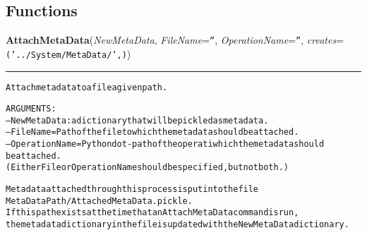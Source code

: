 
  \subsection{Functions}

    \label{System:MetaData:AttachMetaData}

    \vspace{0.5ex}

\hspace{.8\funcindent}\begin{boxedminipage}{\funcwidth}

    \raggedright \textbf{AttachMetaData}(\textit{NewMetaData}, \textit{FileName}={\tt ''}, \textit{OperationName}={\tt ''}, \textit{creates}={\tt ('../System/MetaData/',)})

    \vspace{-1.5ex}

    \rule{\textwidth}{0.5\fboxrule}
\setlength{\parskip}{2ex}
\begin{alltt}

Attach metadata to a file a given path.    

ARGUMENTS:
--NewMetaData : a dictionary that will be pickled as metadata.  
--FileName = Path of the file to which the metadata should be attached.
--OperationName = Python dot-path of the operati which the metadata should 
be attached. 
(Either File or OperationName should be specified, but not both.)
        
Metadata attached through this process is put into the file 
        MetaDataPath/AttachedMetaData.pickle.
If this path exists at the time that an AttachMetaData command is run,
the metadata dictionary in the file is updated with the NewMetaData dictionary. 
        
\end{alltt}

\setlength{\parskip}{1ex}
    \end{boxedminipage}

    \label{System:MetaData:MakeRuntimeMetaData}

